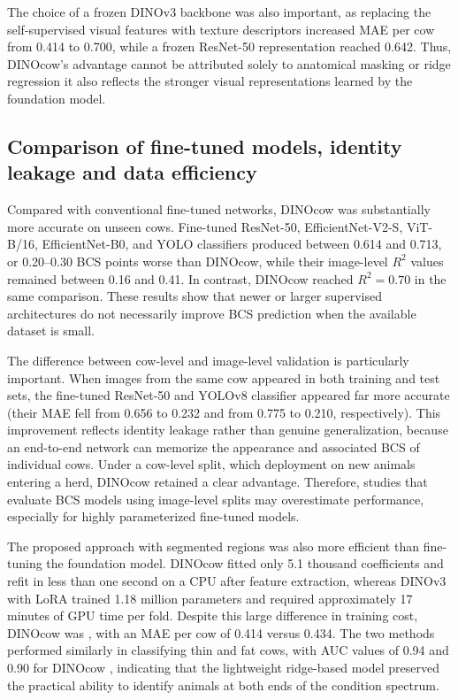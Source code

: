 The choice of a frozen DINOv3 backbone was also important, as replacing the self-supervised visual features with  texture descriptors increased MAE per cow from 0.414 to 0.700, while a frozen ResNet-50 representation reached 0.642.
Thus, DINOcow's advantage cannot be attributed solely to anatomical masking or ridge regression it also reflects the stronger visual representations learned by the foundation model.

\subsection{Comparison of fine-tuned models, identity leakage and data efficiency}

Compared with conventional fine-tuned networks, DINOcow was substantially more accurate on unseen cows.
Fine-tuned ResNet-50, EfficientNet-V2-S, ViT-B/16, EfficientNet-B0, and YOLO classifiers produced  between 0.614 and 0.713, or 0.20--0.30 BCS points worse than DINOcow, while their image-level $R^2$ values remained between 0.16 and 0.41.
In contrast, DINOcow reached $R^2 = 0.70$ in the same comparison.
These results show that newer or larger supervised architectures do not necessarily improve BCS prediction when the available  dataset is small.

The difference between cow-level and image-level validation is particularly important.
When images from the same cow appeared in both training and test sets, the fine-tuned ResNet-50 and YOLOv8 classifier appeared far more accurate (their MAE fell from 0.656 to 0.232 and from 0.775 to 0.210, respectively).
This improvement reflects identity leakage rather than genuine generalization, because an end-to-end network can memorize the appearance and associated BCS of individual cows.
Under a cow-level split, which  deployment on new animals entering a herd, DINOcow retained a clear advantage.
Therefore, studies that evaluate BCS models using image-level splits may overestimate  performance, especially for highly parameterized fine-tuned models.

The proposed approach with segmented regions was also more efficient than fine-tuning the foundation model.
DINOcow fitted only 5.1 thousand coefficients and refit in less than one second on a CPU after feature extraction, whereas DINOv3 with LoRA trained 1.18 million parameters and required approximately 17 minutes of GPU time per fold.
Despite this large difference in training cost, DINOcow was , with an MAE per cow of 0.414 versus 0.434.
The two methods performed similarly in classifying thin and fat cows, with AUC values of 0.94 and 0.90 for DINOcow , indicating that the lightweight ridge-based model preserved the practical ability to identify animals at both ends of the condition spectrum.

